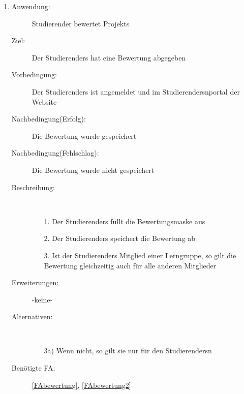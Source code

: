 \documentclass[parskip=full]{scrartcl}
\newcommand{\swtLabel}[1]{\textbf{/#1\arabic*0/}}
\begin{document}
\begin{enumerate}[label=\swtLabel{S}]
\begin{description}
  	\item[Nachbedingung(Erfolg):] \gls{Studierender} ist kein Mitglied der
  	\gls{Lerngruppe} mehr
  	
  	\item[Nachbedingung(Fehlschlag):] \gls{Studierender} ist immer noch Mitglied der
  	\gls{Lerngruppe}
  	\item[Beschreibung:]~
  	\begin{enumerate}
  	  \item[1.] Der \glspl{Studierender} klickt auf \gls{Lerngruppe}. Nun befindet er sich
  	  in der \enquote{\gls{Lerngruppe}}-Maske %
  	  \item[2.] Der \glspl{Studierender} klickt auf \enquote{Austreten}
 
  	\end{enumerate}
  	\item[Erweiterungen:] -keine-

  	\item[Alternativen:] -keine-

  	 \item[Benötigte FA:] \ref{FAlergAustritt}
  \end{description}
%   
  
  \item \label{UCstudBewertung}
  \begin{description}
  \item[Anwendung:] \gls{Studierender} bewertet \glspl{Projekt}
  \item[Ziel:] Der \glspl{Studierender} hat eine \gls{Bewertung} abgegeben
  	\item[Vorbedingung:] Der \glspl{Studierender} ist angemeldet und im \glspl{Studierender}nportal der
  	Website
  	\item[Nachbedingung(Erfolg):] Die \gls{Bewertung} wurde gespeichert
  	\item[Nachbedingung(Fehlschlag):] Die \gls{Bewertung} wurde nicht gespeichert
  	\item[Beschreibung:]~
  	 \begin{enumerate}
  	   \item[1.] Der \glspl{Studierender} füllt die \gls{Bewertung}smaske aus %
  	   \item[2.] Der \glspl{Studierender} speichert die \gls{Bewertung} ab
  	   \item[3.] Ist der \glspl{Studierender} Mitglied einer \gls{Lerngruppe}, so gilt die
  	   \gls{Bewertung} gleichzeitig auch für alle anderen Mitglieder
  	 \end{enumerate}
  	\item[Erweiterungen:] -keine-
  	\item[Alternativen:] ~
  	\begin{enumerate}
  	  \item[3a)] Wenn nicht, so gilt sie nur für den \glspl{Studierender}n
  	 \end{enumerate}
  	\item[Benötigte FA:] \ref{FAbewertung}, \ref{FAbewertung2}
  \end{description}


\end{enumerate}
\end{document}
